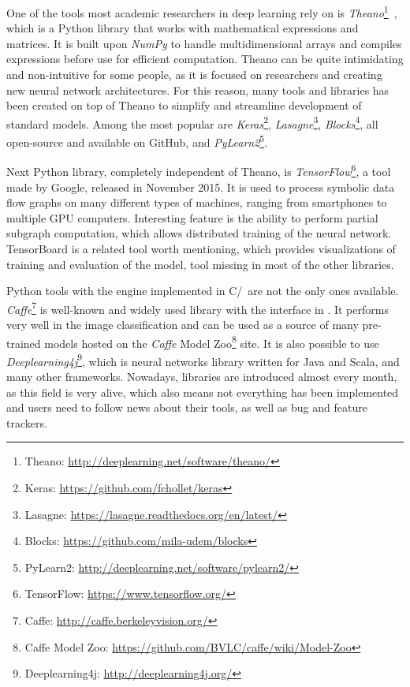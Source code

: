One of the tools most academic researchers in deep learning rely on is \emph{Theano}\footnote{Theano: \url{http://deeplearning.net/software/theano/}}~\cite{bergstra-proc-scipy-2010}, which is a Python library that works with mathematical expressions and matrices. It is built upon \emph{NumPy} to handle multidimensional arrays and compiles expressions before use for efficient computation. Theano can be quite intimidating and non-intuitive for some people, as it is focused on researchers and creating new neural network architectures. For this reason, many tools and libraries has been created on top of Theano to simplify and streamline development of standard models. Among the most popular are \emph{Keras}\footnote{Keras: \url{https://github.com/fchollet/keras}}, \emph{Lasagne}\footnote{Lasagne: \url{https://lasagne.readthedocs.org/en/latest/}}, \emph{Blocks}\footnote{Blocks: \url{https://github.com/mila-udem/blocks}}, all open-source and available on GitHub, and \emph{PyLearn2}\footnote{PyLearn2: \url{http://deeplearning.net/software/pylearn2/}}.

Next Python library, completely independent of Theano, is \emph{TensorFlow}\footnote{TensorFlow: \url{https://www.tensorflow.org/}}, a tool made by Google, released in November 2015. It is used to process symbolic data flow graphs on many different types of machines, ranging from smartphones to multiple GPU computers. Interesting feature is the ability to perform partial subgraph computation, which allows distributed training of the neural network. TensorBoard is a related tool worth mentioning, which provides visualizations of training and evaluation of the model, tool missing in most of the other libraries.

Python tools with the engine implemented in C/\CC\ are not the only ones available. \emph{Caffe}\footnote{Caffe: \url{http://caffe.berkeleyvision.org/}} is well-known and widely used library with the interface in \CC. It performs very well in the image classification and can be used as a source of many pre-trained models hosted on the \emph{Caffe} Model Zoo\footnote{Caffe Model Zoo: \url{https://github.com/BVLC/caffe/wiki/Model-Zoo}} site. It is also possible to use \emph{Deeplearning4j}\footnote{Deeplearning4j: \url{http://deeplearning4j.org/}}, which is neural networks library written for Java and Scala, and many other frameworks. Nowadays, libraries are introduced almost every month, as this field is very alive, which also means not everything has been implemented and users need to follow news about their tools, as well as bug and feature trackers.

